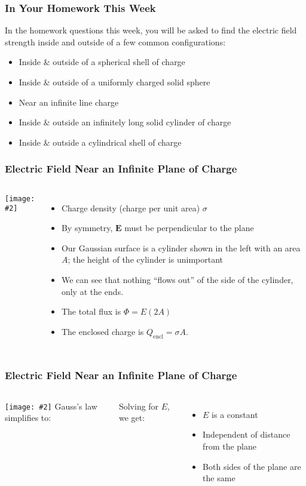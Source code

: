 \documentclass[12pt,aspectratio=169]{beamer}
\newcommand{\pic}[2]{\texttt{[image: \#2]}}
\newcommand{\mb}[1]{\mathbf{#1}}
\newcommand{\eq}[2]{\vspace{#1}{\Large\begin{displaymath}#2\end{displaymath}}}
\begin{document}
\begin{frame}
  \frametitle{In Your Homework This Week}
  In the homework questions this week, you will be asked to find the
  electric field strength inside and outside of a few common configurations:
  \begin{itemize}
  \item Inside \& outside of a spherical shell of charge
  \item Inside \& outside of a uniformly charged solid sphere
  \item Near an infinite line charge
  \item Inside \& outside an infinitely long solid cylinder of charge
  \item Inside \& outside a cylindrical shell of charge
  \end{itemize}
\end{frame}


\begin{frame}
  \frametitle{Electric Field Near an Infinite Plane of Charge}
  \begin{columns}
    \pic{1.3}{elec_gauss_figure9.jpg}
    \begin{itemize}
    \item Charge density (charge per unit area) $\sigma$
    \item By symmetry, $\mb{E}$ must be perpendicular to the plane
    \item Our Gaussian surface is a cylinder shown in the left with an area
      $A$; the height of the cylinder is unimportant
    \item We can see that nothing ``flows out'' of the side of the cylinder,
      only at the ends.
    \item The total flux is $\Phi=E(2A)$
    \item The enclosed charge is $Q_\mathrm{encl}=\sigma A$.
    \end{itemize}
  \end{columns}
\end{frame}


\begin{frame}
  \frametitle{Electric Field Near an Infinite Plane of Charge}
  \begin{columns}
    \pic{1.25}{elec_gauss_figure9.jpg}
    Gauss's law simplifies to:
    
    \eq{-.35in}{
      \oint\mb{E}\cdot d\mb{A}=\frac{Q_\mathrm{encl}}{\epsilon_0}
      \;\;\rightarrow\;\;
      E(2A)=\frac{\sigma A}{\epsilon_0}
    }

    Solving for $E$, we get:

    \eq{-.3in}{\boxed{E=\frac{\sigma}{2\epsilon_0}}}
    \begin{itemize}
    \item $E$ is a constant
    \item Independent of distance from the plane
    \item Both sides of the plane are the same
    \end{itemize}
  \end{columns}
\end{frame}
\end{document}
